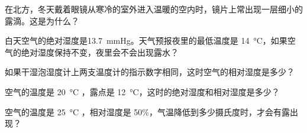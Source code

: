 \begin{Practice}
\begin{question}
	\item 在北方，冬天戴着眼镜从寒冷的室外进入温暖的空内时，镜片上常出现一层细小的露滴。这是为什么？
  \item 白天空气的绝对湿度是\qty{13.7}{mmHg}。天气预报夜里的最低温度是 \qty{14}{\celsius}，如果空气的绝对湿度保持不变，夜里会不会出现露水？
  \item 如果干湿泡湿度计上两支温度计的指示数字相同，这时空气的相对湿度是多少？
  \item 空气的温度是 \qty{20}{\celsius} ，露点是 \qty{12}{\celsius}，这时的绝对湿度和相对湿度是多少？
  \item 空气的温度是 \qty{25}{\celsius} ，相对湿度是 50\%，气温降低到多少摄氏度时，才会有露出现？
\end{question}
\end{Practice}

